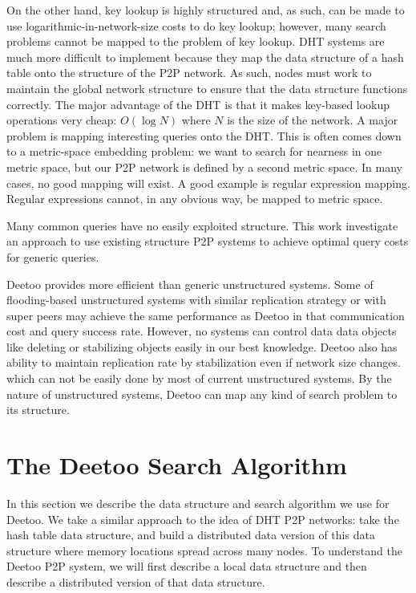 \documentclass[9.5pt,journal,final,finalsubmission,twocolumn]{IEEEtran}
\begin{document}
On the other hand, key lookup is highly structured and, as such, can be made to use 
logarithmic-in-network-size costs to do key lookup; however, 
many search problems cannot be mapped to the problem of key lookup.
DHT systems are much more difficult
to implement because they map the data structure of a hash table onto the structure of the P2P network. 
As such, nodes must work to maintain the global network structure to ensure that 
the data structure functions correctly.
The major advantage of the DHT is that it makes key-based lookup operations 
very cheap: $O(\log{N})$ where $N$ is the size of the network.
A major problem is mapping interesting queries onto the DHT. This is often comes down to a metric-space
embedding problem: we want to search for nearness in one metric space, but our
P2P network is defined by a second metric space. 
In many cases, no good mapping will exist. A good example is regular expression mapping. 
Regular expressions cannot, in any obvious way, be mapped to metric space.

Many common queries have no easily exploited structure. 
This work investigate an approach to use existing structure P2P systems to achieve optimal query
costs for generic queries.

Deetoo provides more efficient than generic unstructured systems.  
Some of flooding-based unstructured systems with similar replication strategy or with super peers 
may achieve the same performance as Deetoo in that communication cost and query success rate. 
However, no systems can control data data objects like deleting or stabilizing objects easily in our best knowledge.
Deetoo also has ability to maintain replication rate by stabilization even if network size changes.
which can not be easily done by most of current unstructured systems.
By the nature of unstructured systems, Deetoo can map any kind of search problem to its structure.
\fi

\section{The Deetoo Search Algorithm}\label{sec:model}
In this section we describe the data structure and search algorithm
we use for Deetoo.  We take a similar approach to the idea of DHT P2P networks: take the hash table
data structure, and build a distributed data version of this data structure
where memory locations spread across many nodes.  
To understand the Deetoo P2P system, we will first describe a local
data structure and then describe a distributed version of that data structure.
\end{document}
